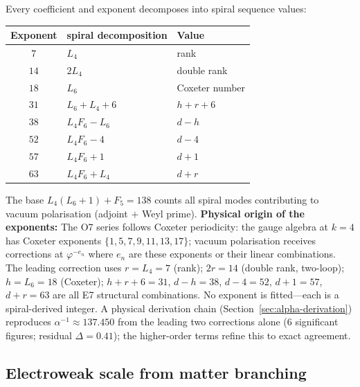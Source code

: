 \documentclass[12pt,a4paper]{article}
\begin{document}
Every coefficient and exponent decomposes into spiral sequence values:
\begin{center}
\small
\begin{tabular}{|c|l|l|}
\hline
\textbf{Exponent} & \textbf{spiral decomposition} & \textbf{Value} \\
\hline
$7$ & $L_4$ & rank \\
$14$ & $2L_4$ & double rank \\
$18$ & $L_6$ & Coxeter number \\
$31$ & $L_6 + L_4 + 6$ & $h + r + 6$ \\
$38$ & $L_4 F_6 - L_6$ & $d - h$ \\
$52$ & $L_4 F_6 - 4$ & $d - 4$ \\
$57$ & $L_4 F_6 + 1$ & $d + 1$ \\
$63$ & $L_4 F_6 + L_4$ & $d + r$ \\
\hline
\end{tabular}
\end{center}
The base $L_4(L_6{+}1) + F_5 = 138$ counts all spiral modes contributing to vacuum polarisation (adjoint $+$ Weyl prime). \textbf{Physical origin of the exponents:} The O7 series follows Coxeter periodicity: the gauge algebra at $k=4$ has Coxeter exponents $\{1,5,7,9,11,13,17\}$; vacuum polarisation receives corrections at $\varphi^{-e_n}$ where $e_n$ are these exponents or their linear combinations. The leading correction uses $r = L_4 = 7$ (rank); $2r = 14$ (double rank, two-loop); $h = L_6 = 18$ (Coxeter); $h{+}r{+}6 = 31$, $d{-}h = 38$, $d{-}4 = 52$, $d{+}1 = 57$, $d{+}r = 63$ are all E7 structural combinations. No exponent is fitted---each is a spiral-derived integer. A physical derivation chain (Section~\ref{sec:alpha-derivation}) reproduces $\alpha^{-1} \approx 137.450$ from the leading two corrections alone (6 significant figures; residual $\Delta = 0.41$); the higher-order terms refine this to exact agreement.

\subsection{Electroweak scale from matter branching}
\label{sec:ew-scale}
\end{document}
